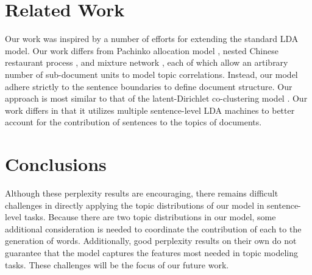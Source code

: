 % 

\section{Related Work} \label{s:related-work} 

Our work was inspired by a number of efforts for extending the standard LDA
model.  Our work differs from Pachinko allocation model \cite{li2006pachinko},
nested Chinese restaurant process \cite{blei2004hierarchical}, and mixture
network \cite{heinrich2009generic}, each of which allow an artibrary number of
sub-document units to model topic correlations.  Instead, our model adhere
strictly to the sentence boundaries to define document structure.  Our approach
is most similar to that of the latent-Dirichlet co-clustering model
\cite{shafiei2006latent}.  Our work differs in that it utilizes multiple
sentence-level LDA machines to better account for the contribution of sentences
to the topics of documents.

\section{Conclusions} \label{s:discussion} 

Although these perplexity results are encouraging, there remains difficult
challenges in directly applying the topic distributions of our model in
sentence-level tasks.  Because there are two topic distributions in our model,
some additional consideration is needed to coordinate the contribution of each
to the generation of words.  Additionally, good perplexity results on their own
do not guarantee that the model captures the features most needed in topic
  modeling tasks.  These challenges will be the focus of our future work.

